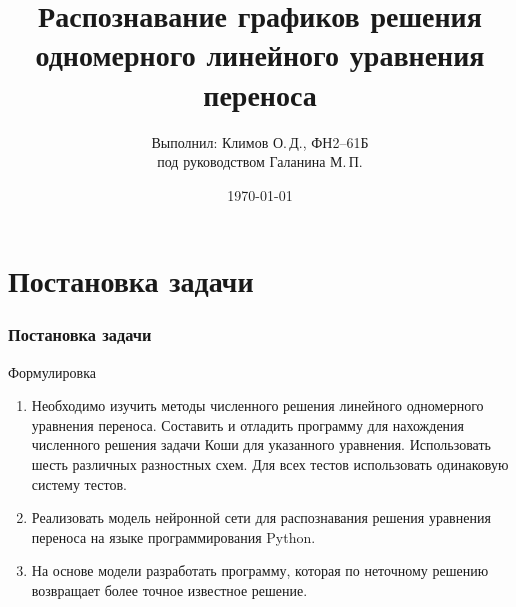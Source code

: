 \documentclass{beamer}
\begin{document}
\title{Распознавание графиков решения
	одномерного линейного уравнения переноса}

\author{Выполнил: Климов О.\,Д., ФН2--61Б \\ под руководством Галанина М.\,П.}

\date{\today}
\begin{frame}

\titlepage

\end{frame}

\section{Постановка задачи}
\begin{frame}
\frametitle{Постановка задачи}

\begin{block}{Формулировка}
\begin{enumerate}
	\item Необходимо изучить методы численного решения линейного одномерного уравнения переноса. Составить и отладить программу для нахождения численного решения задачи Коши для указанного уравнения. Использовать шесть различных разностных схем. Для всех тестов использовать одинаковую систему тестов.
	
	\item Реализовать модель нейронной сети для распознавания решения уравнения переноса на языке программирования Python. 
	
	\item На основе модели разработать программу, которая по неточному решению возвращает более точное известное решение.
\end{enumerate}
\end{block}
\end{frame}
\end{document}
